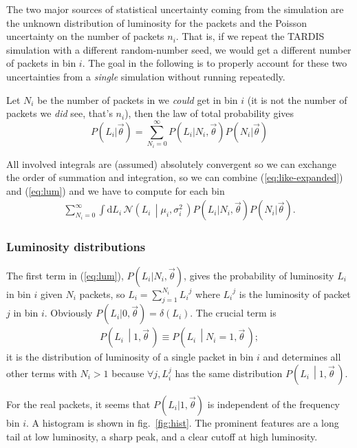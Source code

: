 \documentclass[a4,12pt]{article}
\newcommand{\given}[2]{\left(#1\, \middle| #2 \, \right)}
\newcommand{\gaussian}{\ensuremath{\mathcal{N}}}
\newcommand{\Lumi}{\ensuremath{L_i}}
\newcommand{\rmdx}[1]{\mbox{d} #1 \,} %
\newcommand{\vecth}{\ensuremath{{\vec{\theta}}}}
\def \refeq#1{(\ref{eq:#1})}
\def \reffig#1{fig.~\ref{fig:#1}}
\newcommand{\tardis}{TARDIS}
\begin{document}
The two major sources of statistical uncertainty coming from the
simulation are the unknown distribution of luminosity for the packets
and the Poisson uncertainty on the number of packets $n_i$. That is,
if we repeat the \tardis{} simulation with a different random-number
seed, we would get a different number of packets in bin $i$. The goal
in the following is to properly account for these two uncertainties
from a \emph{single} simulation without running repeatedly.

Let $N_i$ be the number of packets in we \emph{could} get in bin $i$
(it is not the number of packets we \emph{did} see, that's $n_i$),
then the law of total probability gives
\begin{equation}
  \label{eq:lum}
  P(\Lumi | \vecth) = \sum_{N_i=0}^{\infty} P(\Lumi | N_i, \vecth) P(N_i | \vecth)
\end{equation}

All involved integrals are (assumed) absolutely convergent so we can
exchange the order of summation and integration, so we can combine
\refeq{like-expanded} and \refeq{lum} and we have to compute for each bin
\begin{align}
  \label{eq:sum-integral}
  \sum_{N_i=0}^{\infty} \int \rmdx{\Lumi} \gaussian\given{\Lumi}{\mu_i, \sigma_i^2}
  P(\Lumi | N_i, \vecth) P(N_i | \vecth).
\end{align}

\subsubsection{Luminosity distributions}

The first term in \refeq{lum}, $P(\Lumi | N_i, \vecth)$, gives the
probability of luminosity $\Lumi$ in bin $i$ given $N_i$ packets, so
$\Lumi = \sum_{j=1}^{N_i} \Lumi^j$ where $\Lumi^j$ is the luminosity
of packet $j$ in bin $i$. Obviously $P(\Lumi | 0, \vecth) =
\delta(\Lumi)$. The crucial term is
\begin{align}
  \label{eq:single-lum}
  P\given{\Lumi}{1, \vecth} \equiv P\given{L_i}{N_i=1,\vecth};
\end{align}
it is the distribution of luminosity of a single packet in bin $i$ and
determines all other terms with $N_i>1$ because $\forall j, L_i^j$ has
the same distribution $P\given{L_i}{1,\vecth}$.

For the real packets, it seems that $P(\Lumi | 1, \vecth)$ is
independent of the frequency bin $i$. A histogram is shown in
\reffig{hist}.  The prominent features are a long tail at low
luminosity, a sharp peak, and a clear cutoff at high luminosity.
\end{document}
